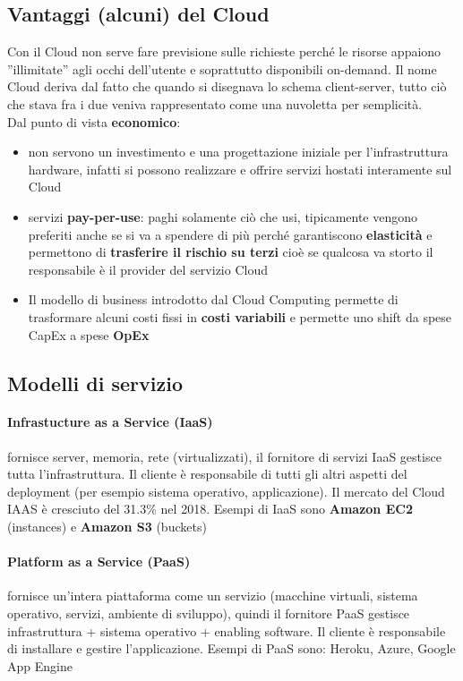 \subsection{Vantaggi (alcuni) del Cloud}
Con il Cloud non serve fare previsione sulle richieste perché le risorse appaiono ”illimitate” agli occhi dell'utente e soprattutto disponibili on-demand. Il nome Cloud deriva dal fatto che quando si disegnava lo schema client-server, tutto ciò che stava fra i due veniva rappresentato come una nuvoletta per semplicità.\\
Dal punto di vista \textbf{economico}:
\begin{itemize}
    \item non servono un investimento e una progettazione iniziale per l’infrastruttura hardware, infatti si possono realizzare e offrire servizi hostati interamente sul Cloud
    \item servizi \textbf{pay-per-use}: paghi solamente ciò che usi, tipicamente vengono preferiti anche se si va a spendere di più perché garantiscono \textbf{elasticità} e permettono di \textbf{trasferire il rischio su terzi} cioè se qualcosa va storto il responsabile è il provider del servizio Cloud
    \item Il modello di business introdotto dal Cloud Computing permette di trasformare alcuni costi fissi in \textbf{costi variabili} e permette uno shift da spese CapEx a spese \textbf{OpEx}
\end{itemize}

\subsection{Modelli di servizio}
\paragraph{Infrastucture as a Service (IaaS)} fornisce server, memoria, rete (virtualizzati), il fornitore di servizi IaaS gestisce tutta l’infrastruttura. Il cliente è responsabile di tutti gli altri aspetti del deployment (per esempio sistema operativo, applicazione). Il mercato del Cloud IAAS è cresciuto del 31.3\% nel 2018. Esempi di IaaS sono \textbf{Amazon EC2} (instances) e \textbf{Amazon S3} (buckets)
\paragraph{Platform as a Service (PaaS)} fornisce un’intera piattaforma come un servizio (macchine virtuali, sistema operativo, servizi, ambiente di sviluppo), quindi il fornitore PaaS gestisce infrastruttura + sistema operativo + enabling software. Il cliente è responsabile di installare e gestire l’applicazione. Esempi di PaaS sono: Heroku, Azure, Google App Engine
